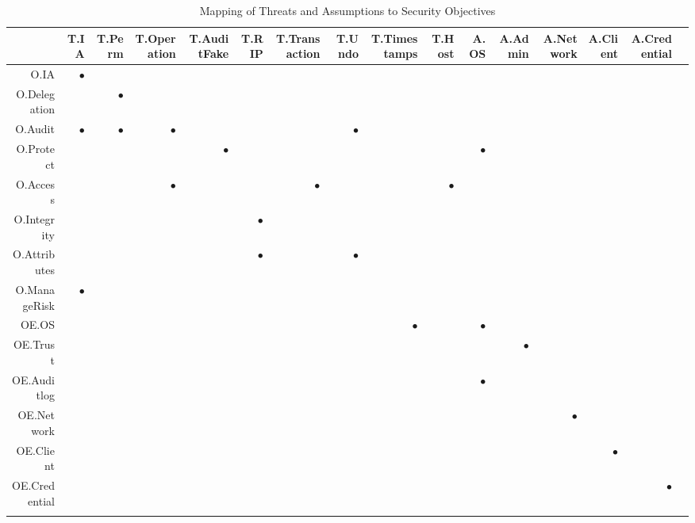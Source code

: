 \documentclass[12pt,english]{scrbook}
\newcommand{\oh}{$\bullet$}
\begin{document}
  \begin{longtable}{rRRRRRRRRRRRRRRR}
    \toprule
              & T.IA  & T.Perm &T.Operation&T.AuditFake& T.RIP&T.Transaction&T.Undo &T.Timestamps & T.Host & A.OS & A.Admin & A.Network & A.Client & A.Credential  \\
    \midrule\endhead
O.IA         &  \oh  &       &            &            &      &             &       &             &        &      &       \\
O.Delegation &       &   \oh &            &            &      &             &       &             &        &      &        \\
O.Audit      & \oh   &   \oh &     \oh    &            &      &             &  \oh  &             &        &      &        \\
O.Protect    &       &       &            &    \oh     &      &             &       &             &        & \oh  &        \\
O.Access     &       &       &      \oh   &            &      &    \oh      &       &             &   \oh  &      &        \\
O.Integrity  &       &       &            &            &  \oh &             &       &             &        &      &        \\
O.Attributes &       &       &            &            &  \oh &             &  \oh  &             &        &      &        \\
O.ManageRisk &   \oh &       &            &            &      &             &       &             &        &      &        \\
\midrule
OE.OS        &       &       &            &            &      &             &       &    \oh      &        &  \oh &         &         &            &          \\
OE.Trust     &       &       &            &            &      &             &       &             &        &      &  \oh    &         &            &            \\
OE.Auditlog  &       &       &            &            &      &             &       &             &        & \oh  &         &         &            &                   \\  
OE.Network   &       &       &            &            &      &             &       &             &        &      &         &  \oh    &            &                   \\   
OE.Client    &       &       &            &            &      &             &       &             &        &      &         &         &    \oh     &                   \\
OE.Credential&       &       &            &            &      &             &       &             &        &      &         &         &            &    \oh    \\ 
\bottomrule
  \caption{Mapping of Threats and Assumptions to Security Objectives}
  \label{tab-SOR}
\end{longtable}
\end{document}
